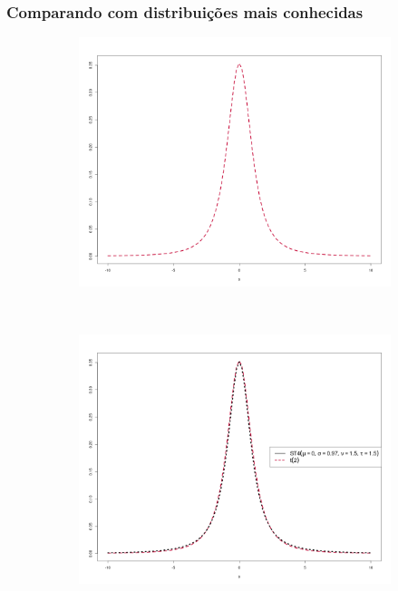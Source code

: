 \documentclass[13pt, aspectratio=169]{beamer}
\begin{document}
\begin{frame}
    \frametitle{Comparando com distribuições mais conhecidas}

   \begin{figure}[!ht]
        \centering
        \begin{subfigure}[t]{0.43\textwidth}
            \centering
            \includegraphics[width=\textwidth]{images/comparando_dists_3.png}
            \caption{}
        \end{subfigure}%
        ~
        \pause
        \begin{subfigure}[t]{0.43\textwidth}
            \centering
            \includegraphics[width=\textwidth]{images/comparando_dists_4.png}
            \caption{}
        \end{subfigure}%
        \caption{}
    \end{figure} 

\end{frame}
\end{document}
